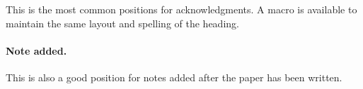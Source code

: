 \documentclass[a4paper,10pt]{article}
\begin{document}
\acknowledgments

This is the most common positions for acknowledgments. A macro is
available to maintain the same layout and spelling of the heading.

\paragraph{Note added.} This is also a good position for notes added
after the paper has been written.



\end{document}
